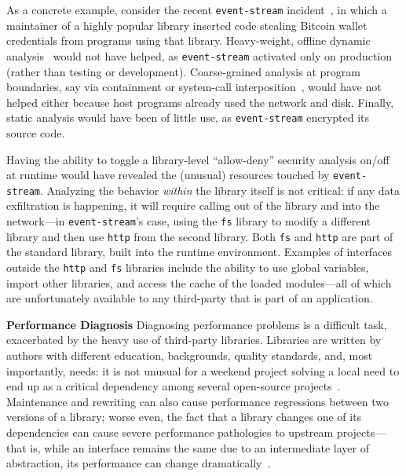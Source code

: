 \documentclass[letterpaper,twocolumn,10pt]{article}
\newcommand{\heading}[1]{\vspace{2pt}\noindent\textbf{#1}\enspace}
\newcommand{\ttt}[1]{\texttt{#1}}
\newcommand{\fixme}[1]{{\color{red}#1}}
\begin{document}
As a concrete example, consider the recent \ttt{event-stream} incident~\cite{es1, es2}, in which a maintainer of a highly popular library inserted code stealing Bitcoin wallet credentials from programs using that library.
Heavy-weight, offline dynamic analysis~\cite{jalangi} would not have helped, as \ttt{event-stream} activated only on production (rather than testing or development).
Coarse-grained analysis at program boundaries, say via containment or system-call interposition~\cite{systrace:03}, would have not helped either because host programs already used the network and disk.
Finally, static analysis would have been of little use, as \ttt{event-stream} encrypted its source code.

Having the ability to toggle a library-level ``allow-deny'' security analysis on/off at runtime would have revealed the (unusual) resources touched by \ttt{event-stream}.
Analyzing the behavior \emph{within} the library itself is not critical:
  if any data exfiltration is happening, it will require calling out of the library and into the network---in \ttt{event-stream}'s case, using the \ttt{fs} library to modify a different library and then use \ttt{http} from the second library.
Both \ttt{fs} and \ttt{http} are part of the standard library, built into the runtime environment.
Examples of interfaces outside the \ttt{http} and \ttt{fs} libraries include the ability to use global variables, import other libraries, and access the cache of the loaded modules---all of which are unfortunately available to any third-party that is part of an application.


\heading{Performance Diagnosis}
Diagnosing performance problems is a difficult task, exacerbated by the heavy use of third-party libraries.
Libraries are written by authors with different education, backgrounds, quality standards, and, most importantly, needs:
  it is not unusual for a weekend project solving a local need to end up as a critical dependency among several open-source projects~\cite{cheapcomplexity}.
Maintenance and rewriting can also cause performance regressions between two versions of a library;
  worse even, the fact that a library changes one of its dependencies can cause severe performance pathologies to upstream projects---that is, while an interface remains the same due to an intermediate layer of abstraction, its performance can change dramatically~\cite{jest}.
\end{document}
